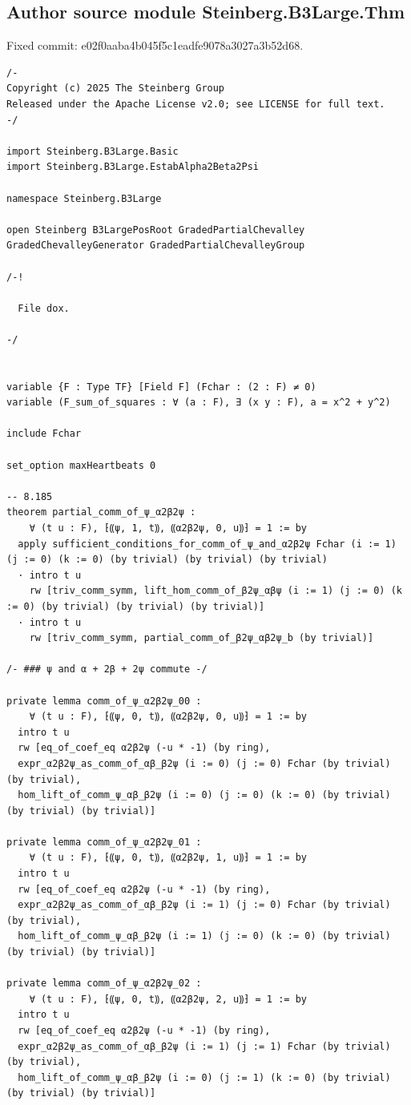 \subsection*{Author source module Steinberg.B3Large.Thm}
\noindent Fixed commit: e02f0aaba4b045f5c1eadfe9078a3027a3b52d68.
\begin{Verbatim}
/-
Copyright (c) 2025 The Steinberg Group
Released under the Apache License v2.0; see LICENSE for full text.
-/

import Steinberg.B3Large.Basic
import Steinberg.B3Large.EstabAlpha2Beta2Psi

namespace Steinberg.B3Large

open Steinberg B3LargePosRoot GradedPartialChevalley GradedChevalleyGenerator GradedPartialChevalleyGroup

/-!

  File dox.

-/


variable {F : Type TF} [Field F] (Fchar : (2 : F) ≠ 0)
variable (F_sum_of_squares : ∀ (a : F), ∃ (x y : F), a = x^2 + y^2)

include Fchar

set_option maxHeartbeats 0

-- 8.185
theorem partial_comm_of_ψ_α2β2ψ :
    ∀ (t u : F), ⁅⸨ψ, 1, t⸩, ⸨α2β2ψ, 0, u⸩⁆ = 1 := by
  apply sufficient_conditions_for_comm_of_ψ_and_α2β2ψ Fchar (i := 1) (j := 0) (k := 0) (by trivial) (by trivial) (by trivial)
  · intro t u
    rw [triv_comm_symm, lift_hom_comm_of_β2ψ_αβψ (i := 1) (j := 0) (k := 0) (by trivial) (by trivial) (by trivial)]
  · intro t u
    rw [triv_comm_symm, partial_comm_of_β2ψ_αβ2ψ_b (by trivial)]

/- ### ψ and α + 2β + 2ψ commute -/

private lemma comm_of_ψ_α2β2ψ_00 :
    ∀ (t u : F), ⁅⸨ψ, 0, t⸩, ⸨α2β2ψ, 0, u⸩⁆ = 1 := by
  intro t u
  rw [eq_of_coef_eq α2β2ψ (-u * -1) (by ring),
  expr_α2β2ψ_as_comm_of_αβ_β2ψ (i := 0) (j := 0) Fchar (by trivial) (by trivial),
  hom_lift_of_comm_ψ_αβ_β2ψ (i := 0) (j := 0) (k := 0) (by trivial) (by trivial) (by trivial)]

private lemma comm_of_ψ_α2β2ψ_01 :
    ∀ (t u : F), ⁅⸨ψ, 0, t⸩, ⸨α2β2ψ, 1, u⸩⁆ = 1 := by
  intro t u
  rw [eq_of_coef_eq α2β2ψ (-u * -1) (by ring),
  expr_α2β2ψ_as_comm_of_αβ_β2ψ (i := 1) (j := 0) Fchar (by trivial) (by trivial),
  hom_lift_of_comm_ψ_αβ_β2ψ (i := 1) (j := 0) (k := 0) (by trivial) (by trivial) (by trivial)]

private lemma comm_of_ψ_α2β2ψ_02 :
    ∀ (t u : F), ⁅⸨ψ, 0, t⸩, ⸨α2β2ψ, 2, u⸩⁆ = 1 := by
  intro t u
  rw [eq_of_coef_eq α2β2ψ (-u * -1) (by ring),
  expr_α2β2ψ_as_comm_of_αβ_β2ψ (i := 1) (j := 1) Fchar (by trivial) (by trivial),
  hom_lift_of_comm_ψ_αβ_β2ψ (i := 0) (j := 1) (k := 0) (by trivial) (by trivial) (by trivial)]


\end{Verbatim}
